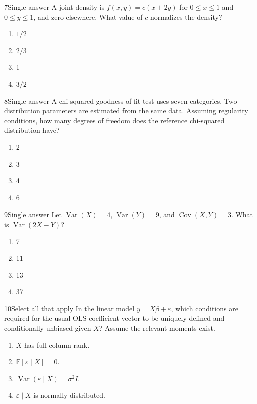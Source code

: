 \documentclass[10pt,a4paper]{article}
\begin{document}
\begin{questionbox}{7}{Single answer}
A joint density is $f(x,y)=c(x+2y)$ for $0\leq x\leq1$ and $0\leq y\leq1$, and zero elsewhere. What value of $c$ normalizes the density?
\begin{enumerate}
  \item $1/2$
  \item $2/3$
  \item 1
  \item $3/2$
\end{enumerate}
\end{questionbox}

\begin{questionbox}{8}{Single answer}
A chi-squared goodness-of-fit test uses seven categories. Two distribution parameters are estimated from the same data. Assuming regularity conditions, how many degrees of freedom does the reference chi-squared distribution have?
\begin{enumerate}
  \item 2
  \item 3
  \item 4
  \item 6
\end{enumerate}
\end{questionbox}

\begin{questionbox}{9}{Single answer}
Let $\operatorname{Var}(X)=4$, $\operatorname{Var}(Y)=9$, and $\operatorname{Cov}(X,Y)=3$. What is $\operatorname{Var}(2X-Y)$?
\begin{enumerate}
  \item 7
  \item 11
  \item 13
  \item 37
\end{enumerate}
\end{questionbox}

\begin{questionbox}{10}{Select all that apply}
In the linear model $y=X\beta+\varepsilon$, which conditions are required for the usual OLS coefficient vector to be uniquely defined and conditionally unbiased given $X$? Assume the relevant moments exist.
\begin{enumerate}
  \item $X$ has full column rank.
  \item $\mathbb{E}[\varepsilon\mid X]=0$.
  \item $\operatorname{Var}(\varepsilon\mid X)=\sigma^2I$.
  \item $\varepsilon\mid X$ is normally distributed.
\end{enumerate}
\end{questionbox}
\end{document}
